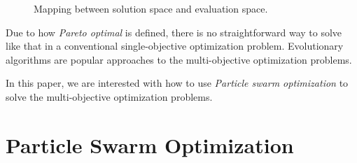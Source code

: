 \documentclass[12pt]{article}
\begin{document}
\begin{figure} 
  \centering 
  \caption{Mapping between solution space and evaluation space.}
  \label{fig:space_mapping} %
\end{figure}

Due to how \emph{Pareto optimal} is defined, there is no straightforward way to solve like that in a conventional single-objective optimization problem.
Evolutionary algorithms are popular approaches to the multi-objective optimization problems. 

In this paper, we are interested with how to use \emph{Particle swarm optimization} to solve the multi-objective optimization problems.

\section{Particle Swarm Optimization}
\end{document}
